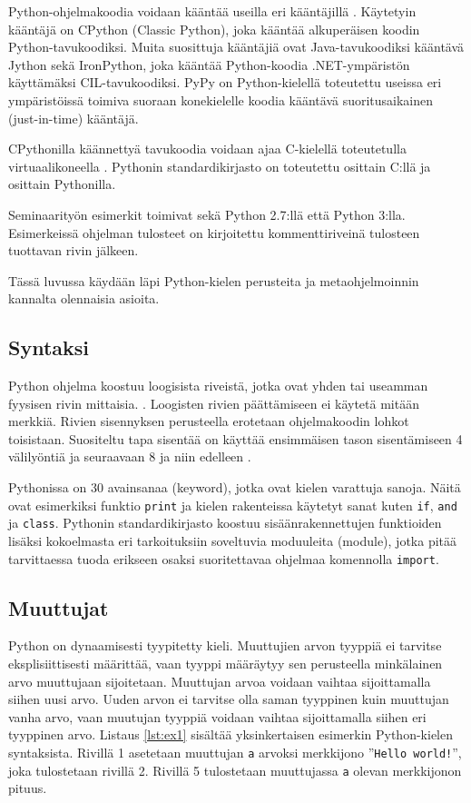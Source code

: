 \documentclass[finnish]{tktltiki2}
\theoremstyle{definition}
\theoremstyle{remark}
\begin{document}
Python-ohjelmakoodia voidaan kääntää useilla eri kääntäjillä \cite{martelli2006python}. Käytetyin kääntäjä on CPython (Classic Python), joka kääntää alkuperäisen koodin Python-tavukoodiksi. Muita suosittuja kääntäjiä ovat Java-tavukoodiksi kääntävä Jython sekä IronPython, joka kääntää Python-koodia .NET-ympäristön käyttämäksi CIL-tavukoodiksi. PyPy on Python-kielellä toteutettu useissa eri ympäristöissä toimiva suoraan konekielelle koodia kääntävä suoritusaikainen (just-in-time) kääntäjä. %

CPythonilla käännettyä tavukoodia voidaan ajaa C-kielellä toteutetulla virtuaalikoneella \cite{martelli2006python}. Pythonin standardikirjasto on toteutettu osittain C:llä ja osittain Pythonilla.

Seminaarityön esimerkit toimivat sekä Python 2.7:llä että Python 3:lla. Esimerkeissä ohjelman tulosteet on kirjoitettu kommenttiriveinä tulosteen tuottavan rivin jälkeen.

Tässä luvussa käydään läpi Python-kielen perusteita ja metaohjelmoinnin kannalta olennaisia asioita.

\subsection{Syntaksi}

Python ohjelma koostuu loogisista riveistä, jotka ovat yhden tai useamman fyysisen rivin mittaisia. \cite{martelli2006python}. Loogisten rivien päättämiseen ei käytetä mitään merkkiä. Rivien sisennyksen perusteella erotetaan ohjelmakoodin lohkot toisistaan. Suositeltu tapa sisentää on käyttää ensimmäisen tason sisentämiseen 4 välilyöntiä ja seuraavaan 8 ja niin edelleen \cite{pep8}. 

Pythonissa on 30 avainsanaa (keyword), jotka ovat kielen varattuja sanoja. Näitä ovat esimerkiksi funktio \verb|print| ja kielen rakenteissa käytetyt sanat kuten \verb|if|, \verb|and| ja \verb|class|. Pythonin standardikirjasto koostuu sisäänrakennettujen funktioiden lisäksi kokoelmasta eri tarkoituksiin soveltuvia moduuleita (module), jotka pitää tarvittaessa tuoda erikseen osaksi suoritettavaa ohjelmaa komennolla \verb|import|.

\subsection{Muuttujat}

Python on dynaamisesti tyypitetty kieli. Muuttujien arvon tyyppiä ei tarvitse eksplisiittisesti määrittää, vaan tyyppi määräytyy sen perusteella minkälainen arvo muuttujaan sijoitetaan. Muuttujan arvoa voidaan vaihtaa sijoittamalla siihen uusi arvo. Uuden arvon ei tarvitse olla saman tyyppinen kuin muuttujan vanha arvo, vaan muutujan tyyppiä voidaan vaihtaa sijoittamalla siihen eri tyyppinen arvo. Listaus \ref{lst:ex1} sisältää yksinkertaisen esimerkin Python-kielen syntaksista. Rivillä 1 asetetaan muuttujan \verb|a| arvoksi merkkijono ''\verb|Hello world!|'', joka tulostetaan rivillä 2. Rivillä 5 tulostetaan muuttujassa \verb|a| olevan merkkijonon pituus.
\end{document}
